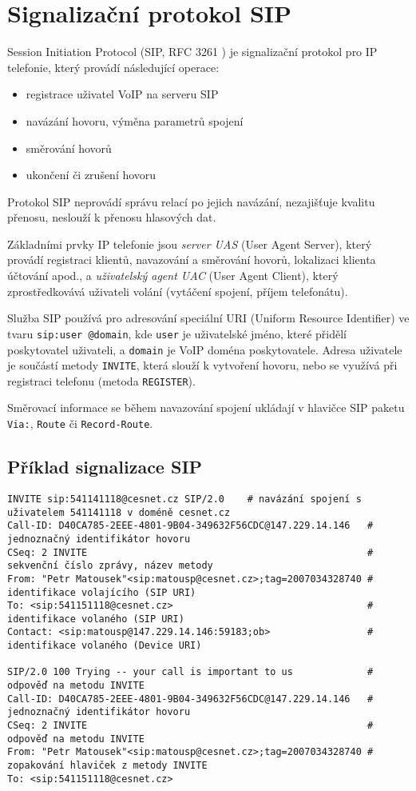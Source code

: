 \section{Signalizační protokol SIP}\label{sip}
Session Initiation Protocol (SIP, RFC 3261 \cite{rfc3261}) je signalizační protokol pro IP telefonie, který provádí následující operace:
\begin{itemize}
    \item registrace uživatel VoIP na serveru SIP
    \item navázání hovoru, výměna parametrů spojení
    \item směrování hovorů
    \item ukončení či zrušení hovoru
\end{itemize}

Protokol SIP neprovádí správu relací po jejich navázání, nezajišťuje kvalitu přenosu, neslouží k přenosu hlasových dat.

Základními prvky IP telefonie jsou {\em server UAS} (User Agent Server), který provádí registraci klientů, navazování a směrování hovorů, lokalizaci klienta účtování apod., a {\em uživatelský agent UAC} (User Agent Client), který zprostředkovává uživateli volání (vytáčení spojení, příjem telefonátu). 

Služba SIP používá pro adresování speciální URI (Uniform Resource Identifier) ve tvaru {\tt sip:user @domain}, kde {\tt user} je uživatelské jméno, které přidělí poskytovatel uživateli, a {\tt domain} je VoIP doména poskytovatele. Adresa uživatele je součástí metody {\tt INVITE}, která slouží k vytvoření hovoru, nebo se využívá při registraci telefonu (metoda {\tt REGISTER}). 

Směrovací informace se během navazování spojení ukládají v hlavičce SIP paketu {\tt Via:}, {\tt Route} či {\tt Record-Route}. 

\subsection{Příklad signalizace SIP}
{\footnotesize
\begin{verbatim}
INVITE sip:541141118@cesnet.cz SIP/2.0    # navázání spojení s uživatelem 541141118 v doméně cesnet.cz
Call-ID: D40CA785-2EEE-4801-9B04-349632F56CDC@147.229.14.146   # jednoznačný identifikátor hovoru
CSeq: 2 INVITE                                                 # sekvenční číslo zprávy, název metody
From: "Petr Matousek"<sip:matousp@cesnet.cz>;tag=2007034328740 # identifikace volajícího (SIP URI)
To: <sip:541151118@cesnet.cz>                                  # identifikace volaného (SIP URI)
Contact: <sip:matousp@147.229.14.146:59183;ob>                 # identifikace volaného (Device URI)

SIP/2.0 100 Trying -- your call is important to us             # odpověď na metodu INVITE
Call-ID: D40CA785-2EEE-4801-9B04-349632F56CDC@147.229.14.146   # jednoznačný identifikátor hovoru
CSeq: 2 INVITE                                                 # odpověď na metodu INVITE   
From: "Petr Matousek"<sip:matousp@cesnet.cz>;tag=2007034328740 # zopakování hlaviček z metody INVITE
To: <sip:541151118@cesnet.cz>
\end{verbatim}
}

